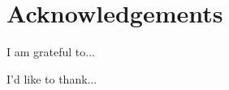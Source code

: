 \thispagestyle{empty}


\section*{\centering Acknowledgements}

I am grateful to...

I'd like to thank...

